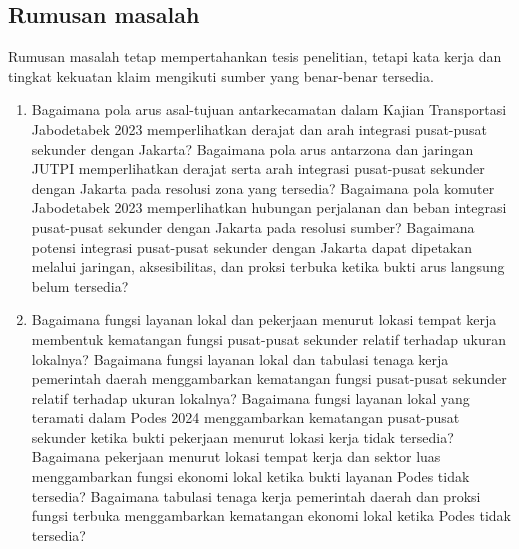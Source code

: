 \documentclass[11pt]{article}
\begin{document}
{{{{{{            \subsection*{Rumusan masalah}
            Rumusan masalah tetap mempertahankan tesis penelitian, tetapi kata kerja dan tingkat kekuatan klaim mengikuti sumber yang benar-benar tersedia.
            \begin{enumerate}
              \item
              \ifnum{}
                Bagaimana pola arus asal-tujuan antarkecamatan dalam Kajian Transportasi Jabodetabek 2023 memperlihatkan derajat dan arah integrasi pusat-pusat sekunder dengan Jakarta?
              \else
                \ifnum{}
                  Bagaimana pola arus antarzona dan jaringan JUTPI memperlihatkan derajat serta arah integrasi pusat-pusat sekunder dengan Jakarta pada resolusi zona yang tersedia?
                \else
                  \ifnum{}
                    Bagaimana pola komuter Jabodetabek 2023 memperlihatkan hubungan perjalanan dan beban integrasi pusat-pusat sekunder dengan Jakarta pada resolusi sumber?
                  \else
                    Bagaimana potensi integrasi pusat-pusat sekunder dengan Jakarta dapat dipetakan melalui jaringan, aksesibilitas, dan proksi terbuka ketika bukti arus langsung belum tersedia?
                  \fi
                \fi
              \fi
              \item
              \ifnum{}
                \ifnum{}
                  Bagaimana fungsi layanan lokal dan pekerjaan menurut lokasi tempat kerja membentuk kematangan fungsi pusat-pusat sekunder relatif terhadap ukuran lokalnya?
                \else
                  \ifnum{}
                    Bagaimana fungsi layanan lokal dan tabulasi tenaga kerja pemerintah daerah menggambarkan kematangan fungsi pusat-pusat sekunder relatif terhadap ukuran lokalnya?
                  \else
                    Bagaimana fungsi layanan lokal yang teramati dalam Podes 2024 menggambarkan kematangan pusat-pusat sekunder ketika bukti pekerjaan menurut lokasi kerja tidak tersedia?
                  \fi
                \fi
              \else
                \ifnum{}
                  Bagaimana pekerjaan menurut lokasi tempat kerja dan sektor luas menggambarkan fungsi ekonomi lokal ketika bukti layanan Podes tidak tersedia?
                \else
                  \ifnum{}
                    Bagaimana tabulasi tenaga kerja pemerintah daerah dan proksi fungsi terbuka menggambarkan kematangan ekonomi lokal ketika Podes tidak tersedia?

\end{enumerate}}}}}}}
\end{document}
